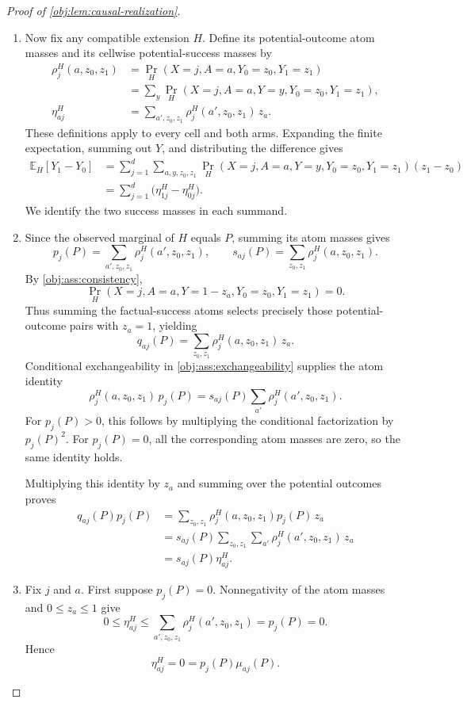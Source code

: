 \begin{proof}[Proof of \cref{obj:lem:causal-realization}]
\begin{enumerate}
\item
Now fix any compatible extension \(H\). Define its potential-outcome
atom masses and its cellwise potential-success masses by
\[
\begin{aligned}
\rho^H_j(a,z_0,z_1)
&=\Pr_H(X=j,A=a,Y_0=z_0,Y_1=z_1)\\
&=\sum_y\Pr_H(X=j,A=a,Y=y,Y_0=z_0,Y_1=z_1),\\
\eta^H_{aj}
&=\sum_{a',z_0,z_1}\rho^H_j(a',z_0,z_1)\,z_a.
\end{aligned}
\]
These definitions apply to every cell and both arms. Expanding the
finite expectation, summing out \(Y\), and distributing the
difference gives
\[
\begin{aligned}
\mathbb E_H[Y_1-Y_0]
&=\sum_{j=1}^{d}\sum_{a,y,z_0,z_1}
 \Pr_H(X=j,A=a,Y=y,Y_0=z_0,Y_1=z_1)(z_1-z_0)\\
&=\sum_{j=1}^{d}\bigl(\eta^H_{1j}-\eta^H_{0j}\bigr).
\end{aligned}
\]
We identify the two success masses in each summand.

\item
Since the observed marginal of \(H\) equals \(P\), summing its atom
masses gives
\[
p_j(P)=\sum_{a',z_0,z_1}\rho^H_j(a',z_0,z_1),
\qquad
s_{aj}(P)=\sum_{z_0,z_1}\rho^H_j(a,z_0,z_1).
\]
By \cref{obj:ass:consistency},
\[
\Pr_H(X=j,A=a,Y=1-z_a,Y_0=z_0,Y_1=z_1)=0.
\]
Thus summing the factual-success atoms selects precisely those
potential-outcome pairs with \(z_a=1\), yielding
\[
q_{aj}(P)=\sum_{z_0,z_1}\rho^H_j(a,z_0,z_1)\,z_a.
\]
Conditional exchangeability in
\cref{obj:ass:exchangeability} supplies the atom identity
\[
\rho^H_j(a,z_0,z_1)\,p_j(P)
=
s_{aj}(P)\sum_{a'}\rho^H_j(a',z_0,z_1).
\]
For \(p_j(P)>0\), this follows by multiplying the conditional
factorization by \(p_j(P)^2\). For \(p_j(P)=0\), all the corresponding
atom masses are zero, so the same identity holds.

Multiplying this identity by \(z_a\) and summing over the potential
outcomes proves
\[
\begin{aligned}
q_{aj}(P)p_j(P)
&=\sum_{z_0,z_1}
 \rho^H_j(a,z_0,z_1)p_j(P)\,z_a\\
&=s_{aj}(P)\sum_{z_0,z_1}\sum_{a'}
 \rho^H_j(a',z_0,z_1)\,z_a\\
&=s_{aj}(P)\eta^H_{aj}.
\end{aligned}
\]

\item
Fix \(j\) and \(a\). First suppose \(p_j(P)=0\).
Nonnegativity of the atom masses and \(0\le z_a\le1\) give
\[
0\le\eta^H_{aj}
\le\sum_{a',z_0,z_1}\rho^H_j(a',z_0,z_1)
=p_j(P)=0.
\]
Hence
\[
\eta^H_{aj}=0=p_j(P)\mu_{aj}(P).
\]


\end{enumerate}
\end{proof}
